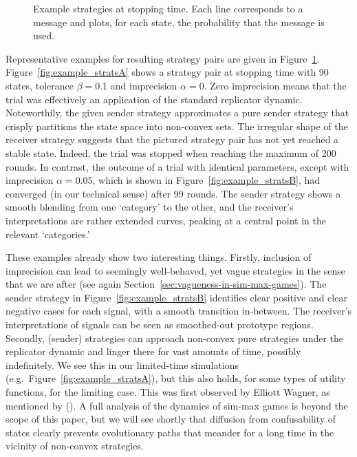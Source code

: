 \documentclass[11pt,english]{article}
\newcommand{\imprecision}{\ensuremath{\alpha}} %
\newcommand{\toler}{\ensuremath{\beta}} %
\newcommand{\ns}{\ensuremath{n_s}} %
\numberwithin{equation}{section}
\newcommand{\citetbjps}[1]{\citeauthor{#1} (\citeyear{#1})}
\begin{document}
\begin{figure}


  \caption{Example strategies at stopping time. Each line corresponds to a message and plots, for each state, the probability that the message is used.}
  \label{fig:example_strats}
\end{figure}

Representative examples for resulting strategy pairs are given in
Figure~\ref{fig:example_strats}. Figure~\ref{fig:example_stratsA} shows a strategy pair at
stopping time with 90 states, tolerance $\toler = 0.1$ and imprecision $\imprecision = 0$. Zero
imprecision means that the trial was effectively an application of the standard replicator dynamic. Noteworthily,
the given sender strategy approximates a pure sender strategy that crisply partitions the state
space into non-convex sets. The irregular shape of the receiver strategy suggests that the
pictured strategy pair has not yet reached a stable state. Indeed,
the trial was stopped when reaching the maximum of 200 rounds. In contrast, the outcome of a
trial with identical parameters, except with imprecision $\imprecision = 0.05$, which is shown
in Figure~\ref{fig:example_stratsB}, had converged (in our technical sense) after 99
rounds. The sender strategy shows a smooth blending from one `category' to the other, and the
receiver's interpretations are rather extended curves, peaking at a central point in the
relevant `categories.'

These examples already show two interesting things. Firstly, inclusion of imprecision can lead
to seemingly well-behaved, yet vague strategies in the sense that we are after (see again Section~\ref{sec:vagueness-in-sim-max-games}). The sender
strategy in Figure~\ref{fig:example_stratsB} identifies clear positive and clear negative cases
for each signal, with a smooth transition in-between. The receiver's interpretations of signals
can be seen as smoothed-out prototype regions. Secondly, (sender) strategies can approach
non-convex pure strategies under the replicator dynamic and linger there for vast amounts of
time, possibly indefinitely. We see this in our limited-time simulations (e.g.~Figure~\ref{fig:example_stratsA}), but this also holds, for some types of utility functions,
for the limiting case. This was first observed by Elliott Wagner, as mentioned by
\citetbjps{OConnor2014-OCOEPC}.  A full analysis of the dynamics of sim-max games is beyond the
scope of this paper, but we will see shortly that diffusion from confusability of states
clearly prevents evolutionary paths that meander for a long time in the vicinity of non-convex
strategies.
\end{document}
